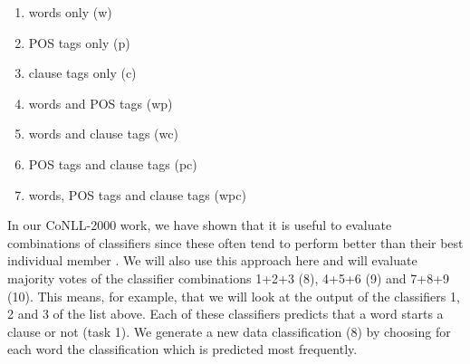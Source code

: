 \documentclass[11pt]{article}
\begin{document}
\begin{enumerate}
\itemsep -0.1cm
\item words only (w)
\item POS tags only (p)
\item clause tags only (c)
\item words and POS tags (wp)
\item words and clause tags (wc)
\item POS tags and clause tags (pc)
\item words, POS tags and clause tags (wpc)
\end{enumerate}

\noindent
In our CoNLL-2000 work, we have shown that it is useful to evaluate 
combinations of classifiers since these often tend to perform better
than their best individual member \cite{tks2000d}.
We will also use this approach here and will evaluate majority votes
of the classifier combinations 1+2+3 (8), 4+5+6 (9) and 7+8+9 (10).
This means, for example, that we will look at the output of the
classifiers 1, 2 and 3 of the list above.
Each of these classifiers predicts that a word starts a clause or not
(task 1).
We generate a new data classification (8) by choosing for each word
the classification which is predicted most frequently.
\end{document}
